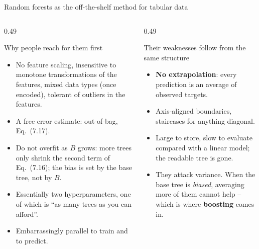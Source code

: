 \documentclass[10pt,aspectratio=169]{beamer}
\begin{document}
\begin{frame}{Random forests as the off-the-shelf method for tabular data}
\begin{columns}[T]
\begin{column}{0.49\textwidth}
\begin{block}{Why people reach for them first}
\begin{itemize}
  \item No feature scaling, insensitive to monotone transformations of the
        features, mixed data types (once encoded), tolerant of outliers in
        the features.
  \item A free error estimate: out-of-bag, Eq.\ (7.17).
  \item Do not overfit as $B$ grows: more trees only shrink the second term
        of Eq.\ (7.16); the bias is set by the base tree, not by $B$.
  \item Essentially two hyperparameters, one of which is ``as many trees as
        you can afford''.
  \item Embarrassingly parallel to train and to predict.
\end{itemize}
\end{block}
\end{column}
\begin{column}{0.49\textwidth}
\begin{block}{Their weaknesses follow from the same structure}
\begin{itemize}
  \item \textbf{No extrapolation}: every prediction is an average of
        observed targets.
  \item Axis-aligned boundaries, staircases for anything diagonal.
  \item Large to store, slow to evaluate compared with a linear model;
        the readable tree is gone.
  \item They attack variance.  When the base tree is \emph{biased},
        averaging more of them cannot help -- which is where
        \textbf{boosting} comes in.
\end{itemize}
\end{block}
\end{column}
\end{columns}
\end{frame}
\end{document}

